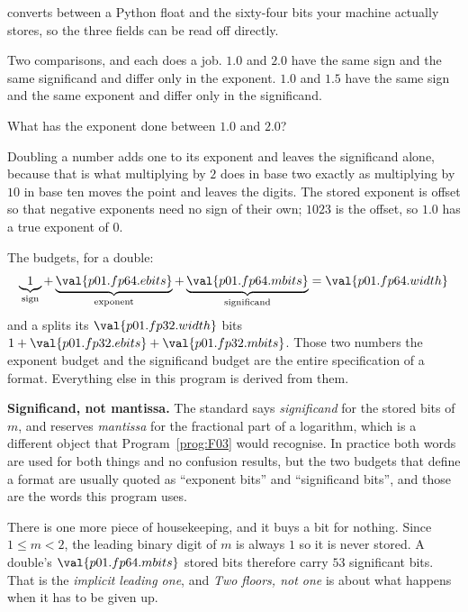 \begin{fr}
 converts between a Python float and the sixty-four bits your
machine actually stores, so the three fields can be read off directly.


Two comparisons, and each does a job. $\num{1.0}$ and $\num{2.0}$ have the
same sign and the same significand and differ only in the exponent.
$\num{1.0}$ and $\num{1.5}$ have the same sign and the same exponent and
differ only in the significand.

What has the exponent done between $\num{1.0}$ and $\num{2.0}$?
\nextframe
\end{fr}

\begin{fr}
Doubling a number adds one to its exponent and leaves the significand alone,
because that is what multiplying by $2$ does in base two \dash{} exactly as
multiplying by $10$ in base ten moves the point and leaves the digits. The
stored exponent is offset so that negative exponents need no sign of their
own; $1023$ is the offset, so $\num{1.0}$ has a true exponent of $0$.

The budgets, for a double:
\[ \underbrace{1}_{\text{sign}} + \underbrace{\val{p01.fp64.ebits}}_{\text{exponent}}
   + \underbrace{\val{p01.fp64.mbits}}_{\text{significand}}
   = \val{p01.fp64.width} \]
and a  splits its $\val{p01.fp32.width}$ bits
$1 + \val{p01.fp32.ebits} + \val{p01.fp32.mbits}$. Those two numbers \dash{}
the exponent budget and the significand budget \dash{} are the entire
specification of a format. Everything else in this program is derived from
them.
\end{fr}

\begin{fr}
\begin{notationbox}
\textbf{Significand, not mantissa.} The standard says \emph{significand} for
the stored bits of $m$, and reserves \emph{mantissa} for the fractional part
of a logarithm, which is a different object that Program~\ref{prog:F03} would
recognise. In practice both words are used for both things and no confusion
results, but the two budgets that define a format are usually quoted as
\enquote{exponent bits} and \enquote{significand bits}, and those are the words
this program uses.
\end{notationbox}

There is one more piece of housekeeping, and it buys a bit for nothing. Since
$1 \le m < 2$, the leading binary digit of $m$ is always $1$ \dash{} so it is
never stored. A double's $\val{p01.fp64.mbits}$ stored bits therefore carry
$53$ significant bits. That is the \emph{implicit leading one}, and \emph{Two floors, not one}
is about what happens when it has to be given up.
\end{fr}

